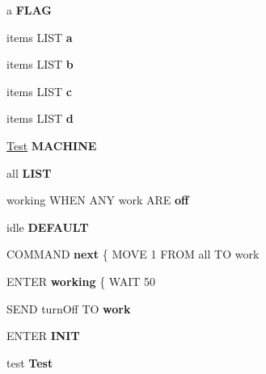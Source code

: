 \begin{DoxyCompactItemize}
\item 
\hypertarget{bug-748_8cw_a55f026d4d4f1ef8414ca9e03e8710d90}{}a {\bfseries F\+L\+A\+G}\label{bug-748_8cw_a55f026d4d4f1ef8414ca9e03e8710d90}

\item 
\hypertarget{bug-748_8cw_ab26836c7b8328e8f6d124981c2973cca}{}items L\+I\+S\+T {\bfseries a}\label{bug-748_8cw_ab26836c7b8328e8f6d124981c2973cca}

\item 
\hypertarget{bug-748_8cw_ac75a82ff73e3ec656d9f2b984d1cc917}{}items L\+I\+S\+T {\bfseries b}\label{bug-748_8cw_ac75a82ff73e3ec656d9f2b984d1cc917}

\item 
\hypertarget{bug-748_8cw_a82051d5b3e39737bc16e8cc3809e18ed}{}items L\+I\+S\+T {\bfseries c}\label{bug-748_8cw_a82051d5b3e39737bc16e8cc3809e18ed}

\item 
\hypertarget{bug-748_8cw_aa61c384e2a5a96a2ac925b18e4c7974e}{}items L\+I\+S\+T {\bfseries d}\label{bug-748_8cw_aa61c384e2a5a96a2ac925b18e4c7974e}

\item 
\hyperlink{struct_test}{Test} {\bfseries M\+A\+C\+H\+I\+N\+E}
\item 
\hypertarget{bug-748_8cw_a5d89a11d432dbaa7eceebb912f15de9b}{}all {\bfseries L\+I\+S\+T}\label{bug-748_8cw_a5d89a11d432dbaa7eceebb912f15de9b}

\item 
\hypertarget{bug-748_8cw_aaa7e978f3f506428532d8bbf42a830ab}{}working W\+H\+E\+N A\+N\+Y work A\+R\+E {\bfseries off}\label{bug-748_8cw_aaa7e978f3f506428532d8bbf42a830ab}

\item 
\hypertarget{bug-748_8cw_a098c964c6349954d41a2c813ed976b8f}{}idle {\bfseries D\+E\+F\+A\+U\+L\+T}\label{bug-748_8cw_a098c964c6349954d41a2c813ed976b8f}

\item 
\hypertarget{bug-748_8cw_a3e2c890e9d261e2aab517704c0e1d6b8}{}C\+O\+M\+M\+A\+N\+D {\bfseries next} \{ M\+O\+V\+E 1 F\+R\+O\+M all T\+O work\label{bug-748_8cw_a3e2c890e9d261e2aab517704c0e1d6b8}

\item 
\hypertarget{bug-748_8cw_a2e1081b306f132ed5eb97abae5ce758f}{}E\+N\+T\+E\+R {\bfseries working} \{ W\+A\+I\+T 50\label{bug-748_8cw_a2e1081b306f132ed5eb97abae5ce758f}

\item 
\hypertarget{bug-748_8cw_a1950d39b873304c3a48f31ec2de70787}{}S\+E\+N\+D turn\+Off T\+O {\bfseries work}\label{bug-748_8cw_a1950d39b873304c3a48f31ec2de70787}

\item 
E\+N\+T\+E\+R {\bfseries I\+N\+I\+T}
\item 
\hypertarget{bug-748_8cw_a0f4ef5ad6636e0e33da8941445c5ffc3}{}test {\bfseries Test}\label{bug-748_8cw_a0f4ef5ad6636e0e33da8941445c5ffc3}

\end{DoxyCompactItemize}


